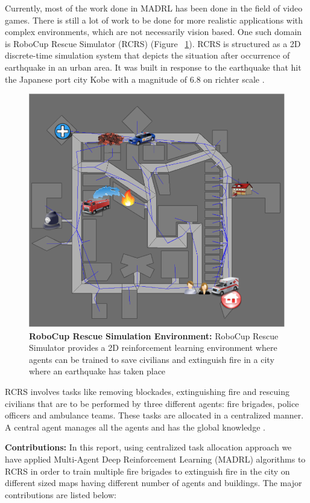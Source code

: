 \documentclass[12pt]{report}
\begin{document}
Currently, most of the work done in MADRL has been done in the field of video games. There is still a lot of work to be done for more realistic applications with complex environments, which are not necessarily vision based. One such domain is RoboCup Rescue Simulator (RCRS) (Figure ~\ref{fig:10}). RCRS is structured as a 2D discrete-time simulation system that depicts the situation after occurrence of earthquake in an urban area. It was built in response to the earthquake that hit the Japanese port city Kobe with a magnitude of 6.8 on richter scale \cite{Bilski}.

\begin{figure}[!h]
    \centering
    \includegraphics[width=12cm]{10.png}
    \caption{\textbf{RoboCup Rescue Simulation Environment:} RoboCup Rescue Simulator provides a 2D reinforcement learning environment where agents can be trained to save civilians and extinguish fire in a city where an earthquake has taken place}
    \label{fig:10}
\end{figure}

RCRS involves tasks like removing blockades, extinguishing fire and rescuing civilians that are to be performed by three different agents: fire brigades, police officers and ambulance teams. These tasks are allocated in a centralized manner. A central agent manages all the agents and has the global knowledge \cite{Nair}. 

\textbf{Contributions:} In this report, using centralized task allocation approach we have applied Multi-Agent Deep Reinforcement Learning (MADRL) algorithms to RCRS in order to train multiple fire brigades to extinguish fire in the city on different sized maps having different number of agents and buildings. The major contributions are listed below: 
\end{document}

